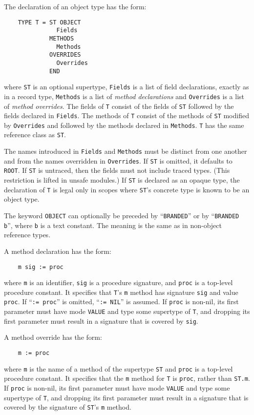 \documentclass[10pt]{article}
\begin{document}
The declaration of an object type has the form:
\begin{verbatim}
    TYPE T = ST OBJECT
               Fields
             METHODS
               Methods
             OVERRIDES
               Overrides
             END
\end{verbatim}
where \verb|ST| is an optional supertype, \verb|Fields| is a list of field
declarations, exactly as in a record type, \verb|Methods| is a list of
\emph{method declarations} and \verb|Overrides| is a list of \emph{method
  overrides}.  The fields of \verb|T| consist of the fields of \verb|ST|
followed by the fields declared in \verb|Fields|.  The methods of \verb|T|
consist of the methods of \verb|ST| modified by \verb|Overrides| and followed
by the methods declared in \verb|Methods|.  \verb|T| has the same reference
class as \verb|ST|.

The names introduced in \verb|Fields| and \verb|Methods| must be distinct from
one another and from the names overridden in \verb|Overrides|.  If \verb|ST|
is omitted, it defaults to \verb|ROOT|.  If \verb|ST| is untraced, then the
fields must not include traced types.  (This restriction is lifted in unsafe
modules.)  If \verb|ST| is declared as an opaque type, the declaration of
\verb|T| is legal only in scopes where \verb|ST|'s concrete type is known to
be an object type.

The keyword \verb|OBJECT| can optionally be preceded by ``\verb|BRANDED|'' or
by ``\verb|BRANDED b|'', where \verb|b| is a text constant.  The meaning is
the same as in non-object reference types.

A method declaration has the form:
\begin{verbatim}
    m sig := proc
\end{verbatim}
where \verb|m| is an identifier, \verb|sig| is a procedure signature, and
\verb|proc| is a top-level procedure constant.  It specifies that \verb|T|'s
\verb|m| method has signature \verb|sig| and value \verb|proc|.  If
``\verb|:= proc|'' is omitted, ``\verb|:= NIL|'' is assumed.  If \verb|proc|
is non-nil, its first parameter must have mode \verb|VALUE| and type some
supertype of \verb|T|, and dropping its first parameter must result in a
signature that is covered by \verb|sig|.

A method override has the form:
\begin{verbatim}
    m := proc
\end{verbatim}
where \verb|m| is the name of a method of the supertype \verb|ST| and
\verb|proc| is a top-level procedure constant.  It specifies that the \verb|m|
method for \verb|T| is \verb|proc|, rather than \verb|ST.m|.  If \verb|proc|
is non-nil, its first parameter must have mode \verb|VALUE| and type some
supertype of \verb|T|, and dropping its first parameter must result in a
signature that is covered by the signature of \verb|ST|'s \verb|m| method.
\end{document}
